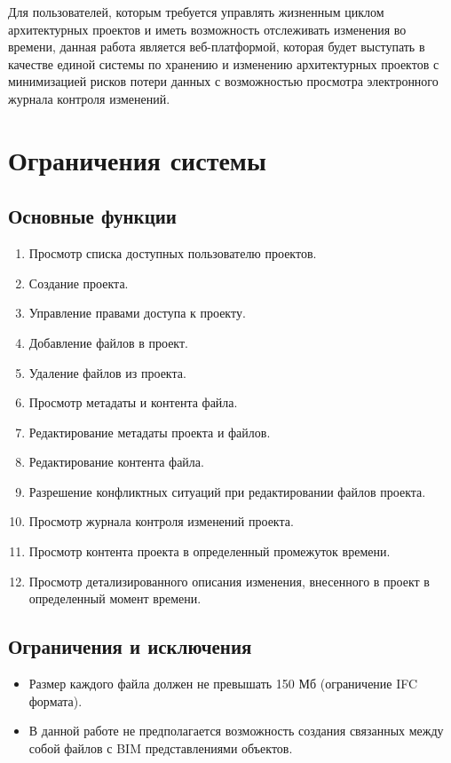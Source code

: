 \documentclass[a4paper,14pt]{extreport} %
\begin{document}
Для пользователей, которым требуется управлять жизненным циклом  архитектурных проектов и иметь возможность отслеживать изменения  во времени, данная работа является веб-платформой, которая будет выступать в качестве единой системы по хранению и изменению архитектурных проектов с минимизацией рисков потери данных с возможностью просмотра электронного журнала контроля изменений.

\newpage
\section{Ограничения системы}
\subsection{Основные функции}

\begin{enumerate}
\item Просмотр списка доступных пользователю проектов.
\item Создание проекта.
\item Управление правами доступа к проекту.
\item Добавление файлов в проект.
\item Удаление файлов из проекта.
\item Просмотр метадаты и контента файла.
\item Редактирование метадаты проекта и файлов.
\item Редактирование контента файла.
\item Разрешение конфликтных ситуаций при редактировании файлов проекта.
\item Просмотр журнала контроля изменений проекта.
\item Просмотр контента проекта в определенный промежуток времени.
\item Просмотр детализированного описания изменения, внесенного в проект в определенный момент времени.
\end {enumerate}

\subsection{Ограничения и исключения}

\begin{itemize}
\item Размер каждого файла должен не превышать 150 Мб (ограничение IFC формата).
\item В данной работе не предполагается возможность создания связанных между собой файлов с BIM представлениями объектов.
\end {itemize}
\end{document}
